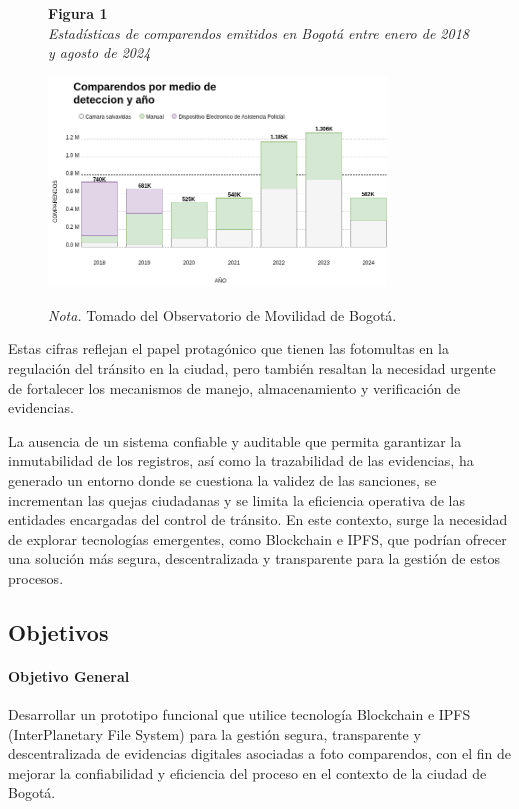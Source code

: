 \documentclass[
    letterpaper, 
    man,   
    spanish,
    12pt,
    donotrepeattitle,
    floatsintext,
    hidelinks %
]{apa7}
\begin{document}
\begin{figure}[htbp]
    \begin{flushleft}
        \textbf{Figura 1}\\
        \textit{Estadísticas de comparendos emitidos en Bogotá entre enero de 2018 y agosto de 2024}
    \end{flushleft}
    \centering
    \includegraphics[width=0.8\textwidth]{Images/numComparendos.png}
    \vspace{0.5em}
    \begin{flushleft}
        \textit{Nota.} Tomado del Observatorio de Movilidad de Bogotá.
    \end{flushleft}
    \label{fig:estadisticas_comparendos}
\end{figure}

Estas cifras reflejan el papel protagónico que tienen las fotomultas en la regulación del tránsito en la ciudad, pero también resaltan la necesidad urgente de fortalecer los mecanismos de manejo, almacenamiento y verificación de evidencias.  

La ausencia de un sistema confiable y auditable que permita garantizar la inmutabilidad de los registros, así como la trazabilidad de las evidencias, ha generado un entorno donde se cuestiona la validez de las sanciones, se incrementan las quejas ciudadanas y se limita la eficiencia operativa de las entidades encargadas del control de tránsito. En este contexto, surge la necesidad de explorar tecnologías emergentes, como Blockchain e IPFS, que podrían ofrecer una solución más segura, descentralizada y transparente para la gestión de estos procesos. 

\subsection{Objetivos}
\paragraph{Objetivo General}
Desarrollar un prototipo funcional que utilice tecnología Blockchain e IPFS (InterPlanetary File System)  para la gestión segura, transparente y descentralizada de evidencias digitales asociadas a foto comparendos, con el fin de mejorar la confiabilidad y eficiencia del proceso en el contexto de la ciudad de Bogotá. 
\end{document}

